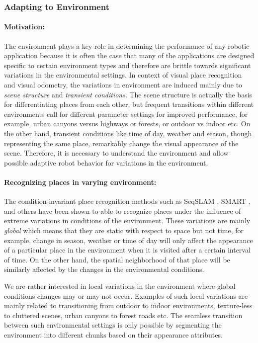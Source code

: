 \documentclass{article}
\begin{document}
\subsubsection{Adapting to Environment}
\paragraph{Motivation:}The environment plays a key role in determining the performance of any robotic application because it is often the case that many of the applications are designed specific to certain environment types and therefore are brittle towards significant variations in the environmental settings. In context of visual place recognition and visual odometry, the variations in environment are induced mainly due to \emph{scene structure} and \emph{transient conditions}. The scene structure is actually the basis for differentiating places from each other, but frequent transitions within different environments call for different parameter settings for improved performance, for example, urban canyons versus highways or forests, or outdoor vs indoor etc. On the other hand, transient conditions like time of day, weather and season, though representing the same place, remarkably change the visual appearance of the scene. Therefore, it is necessary to understand the environment and allow possible adaptive robot behavior for variations in the environment.

\paragraph{Recognizing places in varying environment:}The condition-invariant place recognition methods such as SeqSLAM \cite{Milford2012}, SMART \cite{Pepperell2014}, and others \cite{Naseer2014,Niko2015,Maddern} have been shown to able to recognize places under the influence of extreme variations in conditions of the environment. These variations are mainly \emph{global} which means that they are static with respect to space but not time, for example, change in season, weather or time of day will only affect the appearance of a particular place in the environment when it is visited after a certain interval of time. On the other hand, the spatial neighborhood of that place will be similarly affected by the changes in the environmental conditions. 

We are rather interested in local variations in the environment where global conditions changes may or may not occur. Examples of such local variations are mainly related to transitioning from outdoor to indoor environments, texture-less to cluttered scenes, urban canyons to forest roads etc. The seamless transition between such environmental settings is only possible by segmenting the environment into different chunks based on their appearance attributes.
\end{document}
